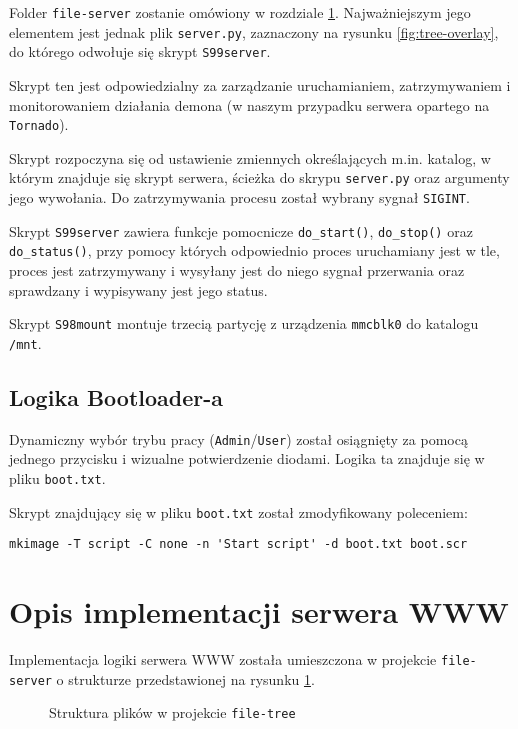 \documentclass{article}
\begin{document}
Folder \texttt{file-server} zostanie omówiony w rozdziale \ref{implementacja-www}. Najważniejszym jego elementem jest jednak plik \texttt{server.py}, zaznaczony na rysunku \ref{fig:tree-overlay}, do którego odwołuje się skrypt \texttt{S99server}. 

Skrypt ten jest odpowiedzialny za zarządzanie uruchamianiem, zatrzymywaniem i monitorowaniem działania demona (w naszym przypadku serwera opartego na \texttt{Tornado}).

Skrypt rozpoczyna się od ustawienie zmiennych określających m.in. katalog, w którym znajduje się skrypt serwera, ścieżka do skrypu \texttt{server.py} oraz argumenty jego wywołania. Do zatrzymywania procesu został wybrany sygnał \texttt{SIGINT}.

Skrypt \texttt{S99server} zawiera funkcje pomocnicze \texttt{do\_start()}, \texttt{do\_stop()} oraz \texttt{do\_status()}, przy pomocy których odpowiednio proces uruchamiany jest w tle, proces jest zatrzymywany i wysyłany jest do niego sygnał przerwania oraz sprawdzany i wypisywany jest jego status.

Skrypt \texttt{S98mount} montuje trzecią partycję z urządzenia \texttt{mmcblk0} do katalogu \texttt{/mnt}.

\subsection{Logika Bootloader-a}

Dynamiczny wybór trybu pracy (\texttt{Admin}/\texttt{User}) został osiągnięty za pomocą jednego przycisku i wizualne potwierdzenie diodami. Logika ta znajduje się w pliku \texttt{boot.txt}.

Skrypt znajdujący się w pliku \texttt{boot.txt} został zmodyfikowany poleceniem:

\begin{verbatim}
mkimage -T script -C none -n 'Start script' -d boot.txt boot.scr
\end{verbatim}

\section{Opis implementacji serwera WWW}
\label{implementacja-www}

Implementacja logiki serwera WWW została umieszczona w projekcie \texttt{file-server} o strukturze przedstawionej na rysunku \ref{fig:tree}.


\begin{figure}[H]
    \caption{Struktura plików w projekcie \texttt{file-tree}}
    \label{fig:tree}
\end{figure}
\end{document}

